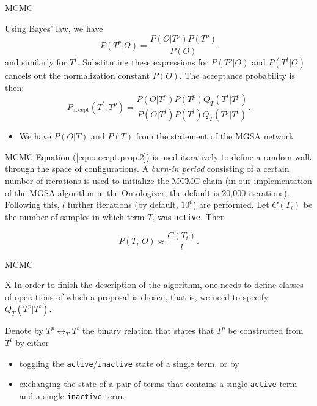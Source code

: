 \documentclass{beamer}
\begin{document}
\begin{frame}{MCMC}
 
 Using Bayes' law, we have
\begin{equation}
 P(T^{p}|O) = \dfrac{P(O|T^{p})P(T^{p})}{P(O)}
 \label{eqn:cond.prob}
\end{equation}
and similarly for $T^{t}$. Substituting these expressions for $P(T^{p}|O)$ and
$P(T^{t}|O)$ cancels out the normalization constant $P(O)$. The acceptance
probability is then:
\begin{equation}
 P_{\text{accept}}(T^t,T^p) = 
 \frac{P(O|T^{p})P(T^{p})Q_T(T^{t}|T^{p})}{P(O|T^{t})P(T^{t})Q_T(T^{p}|T^t)}.
\label{eqn:accept.prop.2}
\end{equation}
 \begin{itemize}
  \item We have $P(O|T)$ and $P(T)$ from the statement of the MGSA network
 \end{itemize}

\end{frame}
\begin{frame}{MCMC}
 Equation (\ref{eqn:accept.prop.2}) is used iteratively to define a
random walk through the space of configurations.  A \emph{burn-in
  period} consisting of a certain number of iterations is used to
initialize the MCMC chain (in our implementation of the MGSA algorithm
in the Ontologizer, the default is 20,000
iterations). Following this, $l$ further iterations (by default,
$10^6$) are performed.  Let $C(T_i)$ be the number of samples in which
term $T_i$ was \texttt{active}. Then

\begin{equation}
P(T_i|O)\approx \frac{C(T_i)}{l}.
\label{eqn:mgsa-marginal}
\end{equation}
 
 
\end{frame}
\begin{frame}{MCMC}
\begin{mybluebox}{X}
 In order to finish the description of the algorithm, one needs to define
classes of operations of which a proposal is chosen, that is, we need to
specify $Q_T(T^p|T^t)$.
\end{mybluebox}


  Denote by $T^p \leftrightarrow_T T^t$ the binary
relation that  states  that $T^p$   be constructed from $T^t$ by either
\begin{itemize}
  \item toggling the \texttt{active}/\texttt{inactive} state of a single term, or by
  \item exchanging the state of a pair of terms that contains a single
    \texttt{active} term and a single \texttt{inactive} term.
\end{itemize}
\end{frame}
\end{document}
